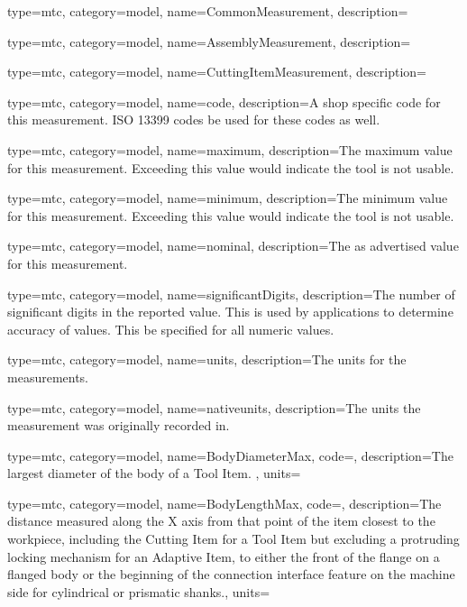 {
  type=mtc,
  category=model,
  name={CommonMeasurement},
  description={}
}


{
  type=mtc,
  category=model,
  name={AssemblyMeasurement},
  description={}
}


{
  type=mtc,
  category=model,
  name={CuttingItemMeasurement},
  description={}
}


{
  type=mtc,
  category=model,
  name={code},
  description={A shop specific code for this measurement. ISO 13399 codes \MAY be used for these codes as well.}
}


{
  type=mtc,
  category=model,
  name={maximum},
  description={The maximum value for this measurement. Exceeding this value would indicate the tool is not usable.}
}


{
  type=mtc,
  category=model,
  name={minimum},
  description={The minimum value for this measurement. Exceeding this value would indicate the tool is not usable.}
}


{
  type=mtc,
  category=model,
  name={nominal},
  description={The as advertised value for this measurement.}
}


{
  type=mtc,
  category=model,
  name={significantDigits},
  description={The number of significant digits in the reported value. This is used by applications to determine accuracy of values. This \MAY be specified for all numeric values.}
}


{
  type=mtc,
  category=model,
  name={units},
  description={The units for the measurements. }
}


{
  type=mtc,
  category=model,
  name={nativeunits},
  description={The units the measurement was originally recorded in. }
}


{
  type=mtc,
  category=model,
  name={BodyDiameterMax},
  code=,
  description={The largest diameter of the body of a Tool Item. },
  units=
}


{
  type=mtc,
  category=model,
  name={BodyLengthMax},
  code=,
  description={The distance measured along the X axis from that point of the item closest to the workpiece, including the Cutting Item for a Tool Item but excluding a protruding locking mechanism for an Adaptive Item, to either the front of the flange on a flanged body or the beginning of the connection interface feature on the machine side for cylindrical or prismatic shanks.},
  units=
}


